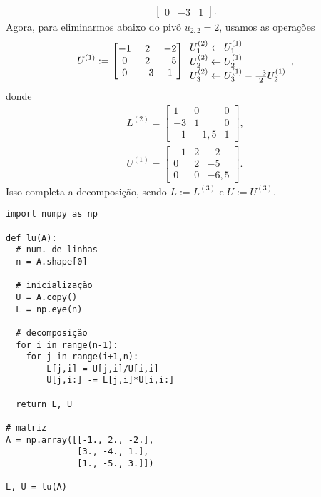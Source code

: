 \begin{ex}
\begin{align}
\begin{bmatrix}
      0 & -3 & 1
    \end{bmatrix}.
  \end{align}
  Agora, para eliminarmos abaixo do pivô $u_{2,2}=2$, usamos as operações
  \begin{equation}
    U^{(1)} :=
    \begin{bmatrix}
      -1 & 2 & -2\\
      0 & 2 & -5\\
      0 & -3 & 1
    \end{bmatrix}
    \begin{array}[]l
      U_1^{(2)}\leftarrow U_1^{(1)} \\
      U_2^{(2)}\leftarrow U_2^{(1)} \\
      U_3^{(2)}\leftarrow U_3^{(1)} - \frac{-3}{2}U_2^{(1)}
    \end{array},
  \end{equation}
  donde
  \begin{align}
    L^{(2)} =
    \begin{bmatrix}
      1 & 0 & 0\\
      -3 & 1 & 0\\
      -1 & -1,5 & 1
    \end{bmatrix},\\
    U^{(1)} =
    \begin{bmatrix}
      -1 & 2 & -2\\
      0 & 2 & -5\\
      0 & 0 & -6,5
    \end{bmatrix}.
  \end{align}
Isso completa a decomposição, sendo $L := L^{(3)}$ e $U := U^{(3)}$.

\begin{lstlisting}[caption=lu.py, label='cap_sislin_sec_lu:cod:lu']
import numpy as np

def lu(A):
  # num. de linhas
  n = A.shape[0]

  # inicialização
  U = A.copy()
  L = np.eye(n)

  # decomposição
  for i in range(n-1):
    for j in range(i+1,n):
        L[j,i] = U[j,i]/U[i,i]
        U[j,i:] -= L[j,i]*U[i,i:]

  return L, U

# matriz
A = np.array([[-1., 2., -2.],
              [3., -4., 1.],
              [1., -5., 3.]])

L, U = lu(A)
\end{lstlisting}

\end{ex}

